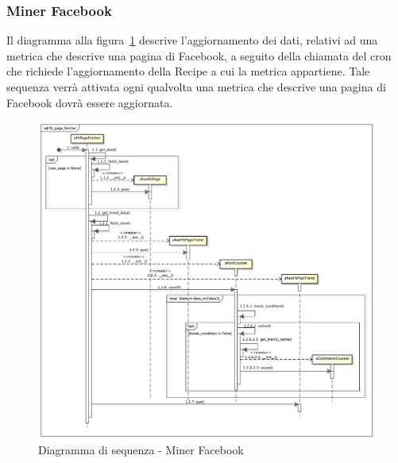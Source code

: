 	\subsubsection{Miner Facebook} %
    \label{ssub:miner_facebook}
    Il diagramma alla figura~\ref{fig:miner_facebook} descrive l'aggiornamento dei dati, relativi ad una metrica che descrive una pagina di Facebook, a seguito della chiamata del cron che richiede l'aggiornamento della Recipe a cui la metrica appartiene. Tale sequenza verrà attivata ogni qualvolta una metrica che descrive una pagina di Facebook dovrà essere aggiornata. \newline

    \begin{figure}[!htbp]
		\centering
			\centerline{\includegraphics[scale=0.4]{./images/sequence_diagram/fb_page_fetcher.pdf}}
		\caption{Diagramma di sequenza - Miner Facebook}
    \label{fig:miner_facebook}
	\end{figure}


